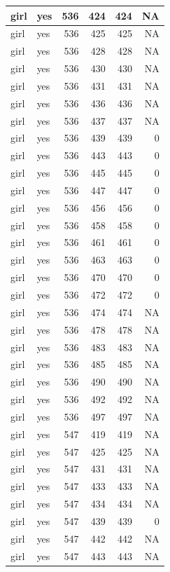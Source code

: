 \documentclass[man]{apa6}
\begin{document}
\begin{tabular}{l|l|r|r|r|r}
\hline
girl & yes & 536 & 424 & 424 & NA\\
\hline
girl & yes & 536 & 425 & 425 & NA\\
\hline
girl & yes & 536 & 428 & 428 & NA\\
\hline
girl & yes & 536 & 430 & 430 & NA\\
\hline
girl & yes & 536 & 431 & 431 & NA\\
\hline
girl & yes & 536 & 436 & 436 & NA\\
\hline
girl & yes & 536 & 437 & 437 & NA\\
\hline
girl & yes & 536 & 439 & 439 & 0\\
\hline
girl & yes & 536 & 443 & 443 & 0\\
\hline
girl & yes & 536 & 445 & 445 & 0\\
\hline
girl & yes & 536 & 447 & 447 & 0\\
\hline
girl & yes & 536 & 456 & 456 & 0\\
\hline
girl & yes & 536 & 458 & 458 & 0\\
\hline
girl & yes & 536 & 461 & 461 & 0\\
\hline
girl & yes & 536 & 463 & 463 & 0\\
\hline
girl & yes & 536 & 470 & 470 & 0\\
\hline
girl & yes & 536 & 472 & 472 & 0\\
\hline
girl & yes & 536 & 474 & 474 & NA\\
\hline
girl & yes & 536 & 478 & 478 & NA\\
\hline
girl & yes & 536 & 483 & 483 & NA\\
\hline
girl & yes & 536 & 485 & 485 & NA\\
\hline
girl & yes & 536 & 490 & 490 & NA\\
\hline
girl & yes & 536 & 492 & 492 & NA\\
\hline
girl & yes & 536 & 497 & 497 & NA\\
\hline
girl & yes & 547 & 419 & 419 & NA\\
\hline
girl & yes & 547 & 425 & 425 & NA\\
\hline
girl & yes & 547 & 431 & 431 & NA\\
\hline
girl & yes & 547 & 433 & 433 & NA\\
\hline
girl & yes & 547 & 434 & 434 & NA\\
\hline
girl & yes & 547 & 439 & 439 & 0\\
\hline
girl & yes & 547 & 442 & 442 & NA\\
\hline
girl & yes & 547 & 443 & 443 & NA\\

\end{tabular}
\end{document}
